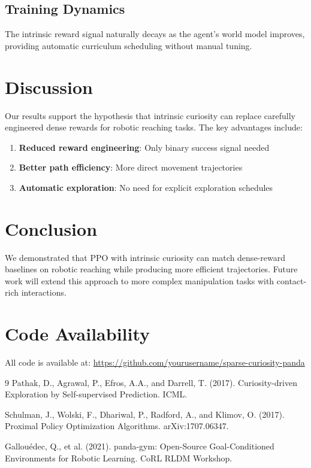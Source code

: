 \documentclass{article}
\begin{document}
\subsection{Training Dynamics}

The intrinsic reward signal naturally decays as the agent's world model improves, providing automatic curriculum scheduling without manual tuning.

\section{Discussion}

Our results support the hypothesis that intrinsic curiosity can replace carefully engineered dense rewards for robotic reaching tasks. The key advantages include:

\begin{enumerate}
    \item \textbf{Reduced reward engineering}: Only binary success signal needed
    \item \textbf{Better path efficiency}: More direct movement trajectories
    \item \textbf{Automatic exploration}: No need for explicit exploration schedules
\end{enumerate}

\section{Conclusion}

We demonstrated that PPO with intrinsic curiosity can match dense-reward baselines on robotic reaching while producing more efficient trajectories. Future work will extend this approach to more complex manipulation tasks with contact-rich interactions.

\section*{Code Availability}

All code is available at: \url{https://github.com/yourusername/sparse-curiosity-panda}


\begin{thebibliography}{9}
Pathak, D., Agrawal, P., Efros, A.A., and Darrell, T. (2017). Curiosity-driven Exploration by Self-supervised Prediction. ICML.

Schulman, J., Wolski, F., Dhariwal, P., Radford, A., and Klimov, O. (2017). Proximal Policy Optimization Algorithms. arXiv:1707.06347.

Gallouédec, Q., et al. (2021). panda-gym: Open-Source Goal-Conditioned Environments for Robotic Learning. CoRL RLDM Workshop.
\end{thebibliography}
\end{document}
